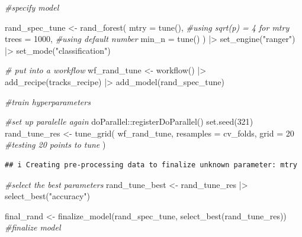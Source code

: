 \documentclass[
]{article}
\newenvironment{Shaded}{\begin{snugshade}}{\end{snugshade}}
\newcommand{\AttributeTok}[1]{\textcolor[rgb]{0.77,0.63,0.00}{#1}}
\newcommand{\CommentTok}[1]{\textcolor[rgb]{0.56,0.35,0.01}{\textit{#1}}}
\newcommand{\DecValTok}[1]{\textcolor[rgb]{0.00,0.00,0.81}{#1}}
\newcommand{\FunctionTok}[1]{\textcolor[rgb]{0.00,0.00,0.00}{#1}}
\newcommand{\NormalTok}[1]{#1}
\newcommand{\OtherTok}[1]{\textcolor[rgb]{0.56,0.35,0.01}{#1}}
\newcommand{\SpecialCharTok}[1]{\textcolor[rgb]{0.00,0.00,0.00}{#1}}
\newcommand{\StringTok}[1]{\textcolor[rgb]{0.31,0.60,0.02}{#1}}
\begin{document}
\begin{Shaded}
\begin{Highlighting}[]
\CommentTok{\#specify model}

\NormalTok{rand\_spec\_tune }\OtherTok{\textless{}{-}} \FunctionTok{rand\_forest}\NormalTok{(}
  \AttributeTok{mtry =} \FunctionTok{tune}\NormalTok{(), }\CommentTok{\#using sqrt(p) = 4 for mtry}
  \AttributeTok{trees =} \DecValTok{1000}\NormalTok{, }\CommentTok{\#using default number}
  \AttributeTok{min\_n =} \FunctionTok{tune}\NormalTok{() }
\NormalTok{) }\SpecialCharTok{|\textgreater{}} 
  \FunctionTok{set\_engine}\NormalTok{(}\StringTok{"ranger"}\NormalTok{) }\SpecialCharTok{|\textgreater{}} 
  \FunctionTok{set\_mode}\NormalTok{(}\StringTok{"classification"}\NormalTok{)}

\CommentTok{\# put into a workflow}
\NormalTok{wf\_rand\_tune }\OtherTok{\textless{}{-}} \FunctionTok{workflow}\NormalTok{() }\SpecialCharTok{|\textgreater{}} 
  \FunctionTok{add\_recipe}\NormalTok{(tracks\_recipe) }\SpecialCharTok{|\textgreater{}} 
  \FunctionTok{add\_model}\NormalTok{(rand\_spec\_tune)}

\CommentTok{\#train hyperparameters}

\CommentTok{\#set up paralelle again}
\NormalTok{doParallel}\SpecialCharTok{::}\FunctionTok{registerDoParallel}\NormalTok{()}
\FunctionTok{set.seed}\NormalTok{(}\DecValTok{321}\NormalTok{)}
\NormalTok{rand\_tune\_res }\OtherTok{\textless{}{-}} \FunctionTok{tune\_grid}\NormalTok{(}
\NormalTok{  wf\_rand\_tune,}
  \AttributeTok{resamples =}\NormalTok{ cv\_folds,}
  \AttributeTok{grid =} \DecValTok{20} \CommentTok{\#testing 20 points to tune}
\NormalTok{)}
\end{Highlighting}
\end{Shaded}

\begin{verbatim}
## i Creating pre-processing data to finalize unknown parameter: mtry
\end{verbatim}

\begin{Shaded}
\begin{Highlighting}[]
\CommentTok{\#select the best parameters}
\NormalTok{rand\_tune\_best }\OtherTok{\textless{}{-}}\NormalTok{ rand\_tune\_res }\SpecialCharTok{|\textgreater{}} 
  \FunctionTok{select\_best}\NormalTok{(}\StringTok{"accuracy"}\NormalTok{)}
\end{Highlighting}
\end{Shaded}

\begin{Shaded}
\begin{Highlighting}[]
\NormalTok{final\_rand }\OtherTok{\textless{}{-}} \FunctionTok{finalize\_model}\NormalTok{(rand\_spec\_tune, }\FunctionTok{select\_best}\NormalTok{(rand\_tune\_res)) }\CommentTok{\#finalize model}
\end{Highlighting}
\end{Shaded}
\end{document}
